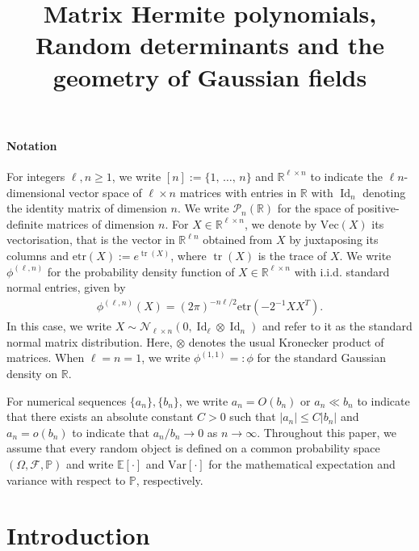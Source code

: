 \documentclass[AHL,Unicode,longabstracts,published]{cedram}
\title[Matrix Hermite polynomials, Random determinants and the geometry of Gaussian fields]{Matrix Hermite polynomials, Random determinants and the geometry of Gaussian fields}
\author[\initial{M.} \lastname{Notarnicola}]{\firstname{Massimo} \lastname{Notarnicola}}
\DeclareMathOperator{\Id}{Id}
\DeclareMathOperator{\Tr}{tr}
\newcommand{\scN}{\mathscr{N}}
\renewcommand{\Vec}{\mathrm{Vec}}
\newcommand{\clP}{\mathcal{P}}
\newcommand{\clF}{\mathcal{F}}
\newcommand{\R}{\mathbb{R}}
\newcommand{\Prob}{\mathbb{P}}
\newcommand{\E}[1]{\mathbb{E}\left[#1\right]}
\newcommand{\V}[1]{\mathrm{Var}{\left[#1\right]}}
\newcommand{\etr}[1]{\mathrm{etr}\left(#1\right)}
\begin{document}
\maketitle



\paragraph{Notation}
For integers $\ell,n\geq 1$, we write $[n]:=\{1,\,\ldots,\,n\}$ and $\R^{\ell \times n}$ to indicate the $\ell n$-dimensional vector space of $\ell\times n$ matrices with entries in $\R$ with $\Id_n$ denoting the identity matrix of dimension $n$. We write $\clP_{n}(\R)$ for the space of positive-definite matrices of dimension $n$. For $X \in \R^{\ell \times n}$, we denote by $\Vec(X)$ its vectorisation, that is the vector in $\R^{\ell n}$ obtained from $X$ by juxtaposing its columns and $\etr{X}:= e^{\Tr(X)}$, where $\Tr(X)$ is the trace of $X$. We write $\phi^{(\ell,n)}$ for the probability density function of $X \in \R^{\ell \times n}$ with i.i.d. standard normal entries, given by
\begin{gather*}
\phi^{(\ell,n)}(X) = (2\pi)^{-n\ell/2} \etr{-2^{-1}XX^T }.
\end{gather*}
In this case, we write $X \sim \scN_{\ell \times n}(0, \Id_{\ell}\otimes \Id_n)$ and refer to it as the standard normal matrix distribution. Here, $\otimes$ denotes the usual Kronecker product of matrices. When $\ell=n=1$, we write $\phi^{(1,1)}=:\phi$ for the standard Gaussian density on $\R$.

For numerical sequences $\{a_n\},\{b_n\}$, we write $a_n=O(b_n)$ or $a_n \ll b_n$ to indicate that there exists an absolute constant $C>0$ such that $|a_n| \leq C|b_n|$ and $a_n=o(b_n)$ to indicate that $a_n/b_n\to0$ as $n \to \infty$. Throughout this paper, we assume that every random object is defined on a common probability space $(\Omega,\clF,\Prob)$ and write $\E{\cdot}$ and $\V{\cdot}$ for the mathematical expectation and variance with respect to $\Prob$, respectively.


\setcounter{tocdepth}{2}
\tableofcontents
\section{Introduction}
\end{document}
